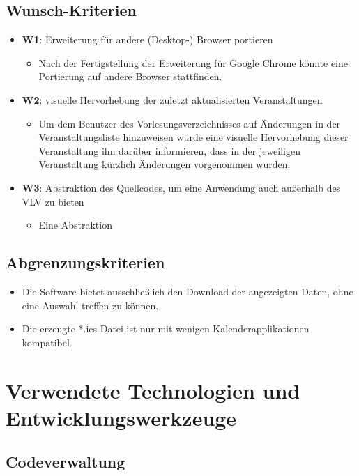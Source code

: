 \documentclass[11pt]{report}
\begin{document}
\section{Wunsch-Kriterien}
\begin{itemize}
\item \textbf{W1}: Erweiterung für andere (Desktop-) Browser portieren
    \begin{itemize}
    \item Nach der Fertigstellung der Erweiterung für Google Chrome könnte eine Portierung auf andere Browser stattfinden.
    \end{itemize}
\item \textbf{W2}: visuelle Hervorhebung der zuletzt aktualisierten Veranstaltungen
    \begin{itemize}
    \item Um dem Benutzer des Vorlesungsverzeichnisses auf \"Anderungen in der Veranstaltungsliste hinzuweisen würde eine visuelle Hervorhebung dieser Veranstaltung ihn darüber informieren, dass in der jeweiligen Veranstaltung k\"urzlich \"Anderungen vorgenommen wurden.
    \end{itemize}
\item \textbf{W3}: Abstraktion des Quellcodes, um eine Anwendung auch außerhalb des VLV zu bieten
    \begin{itemize}
    \item Eine Abstraktion
    \end{itemize}
\end{itemize}

\section{Abgrenzungskriterien}
\begin{itemize}
\item Die Software bietet ausschließlich den Download der angezeigten Daten, ohne eine Auswahl treffen zu k\"onnen.
\item Die erzeugte *.ics Datei ist nur mit wenigen Kalenderapplikationen kompatibel.
\end{itemize}

\chapter{Verwendete Technologien und Entwicklungswerkzeuge}
\section{Codeverwaltung}
\end{document}
